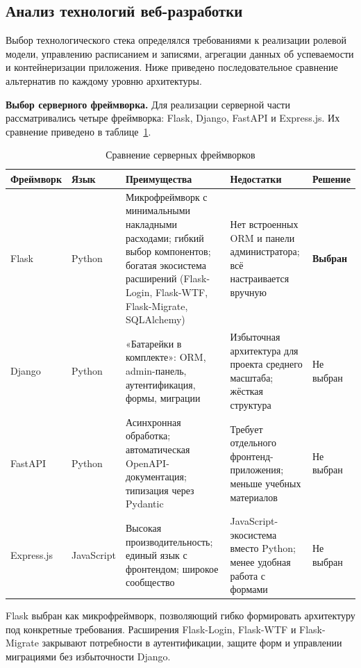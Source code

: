 \subsection{Анализ технологий веб-разработки}

Выбор технологического стека определялся требованиями к реализации ролевой модели,
управлению расписанием и записями, агрегации данных об успеваемости и
контейнеризации приложения. Ниже приведено последовательное сравнение альтернатив
по каждому уровню архитектуры.

\textbf{Выбор серверного фреймворка.} Для реализации серверной части
рассматривались четыре фреймворка: Flask, Django, FastAPI и Express.js. Их
сравнение приведено в таблице~\ref{tab:frameworks}.

\begin{table}[ht!]
    \centering
    \caption{Сравнение серверных фреймворков}
    \label{tab:frameworks}
    \small
    \begin{tabularx}{\textwidth}{|p{2.3cm}|p{1.8cm}|X|X|p{2.2cm}|}
        \hline
        \textbf{Фреймворк} & \textbf{Язык} & \textbf{Преимущества} & \textbf{Недостатки} & \textbf{Решение} \\ \hline
        Flask &
        Python &
        Микрофреймворк с минимальными накладными расходами; гибкий выбор компонентов;
        богатая экосистема расширений (Flask-Login, Flask-WTF, Flask-Migrate, SQLAlchemy) &
        Нет встроенных ORM и панели администратора; всё настраивается вручную &
        \textbf{Выбран} \\ \hline
        Django &
        Python &
        «Батарейки в комплекте»: ORM, admin-панель, аутентификация, формы, миграции &
        Избыточная архитектура для проекта среднего масштаба; жёсткая структура &
        Не выбран \\ \hline
        FastAPI &
        Python &
        Асинхронная обработка; автоматическая OpenAPI-документация; типизация через Pydantic &
        Требует отдельного фронтенд-приложения; меньше учебных материалов &
        Не выбран \\ \hline
        Express.js &
        JavaScript &
        Высокая производительность; единый язык с фронтендом; широкое сообщество &
        JavaScript-экосистема вместо Python; менее удобная работа с формами &
        Не выбран \\ \hline
    \end{tabularx}
\end{table}

Flask выбран как микрофреймворк, позволяющий гибко формировать архитектуру
под конкретные требования. Расширения
Flask-Login, Flask-WTF и Flask-Migrate закрывают потребности в аутентификации,
защите форм и управлении миграциями без избыточности Django.

